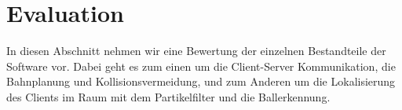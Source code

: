 
\chapter{Evaluation}
\label{cha:evaluation}
In diesen Abschnitt nehmen wir eine Bewertung der einzelnen
Bestandteile der Software vor. Dabei geht es zum einen um die
Client-Server Kommunikation, die Bahnplanung und Kollisionsvermeidung,
und zum Anderen um die Lokalisierung des Clients im Raum mit dem
Partikelfilter und die Ballerkennung.
%

%
%



